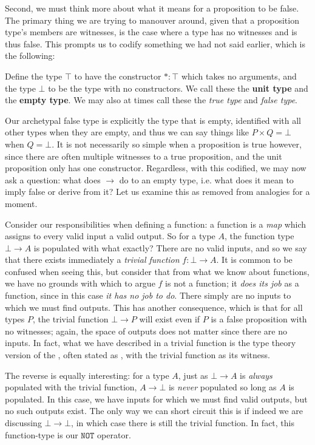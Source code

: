 \documentclass[11pt]{article}
\begin{document}
Second, we must think more about what it means for a proposition to be false. The primary thing we are trying to manouver around, given that a proposition type's members are witnesses, is the case where a type has no witnesses and is thus false. This prompts us to codify something we had not said earlier, which is the following:

\begin{definition}
Define the type $\top$ to have the constructor $* \colon \top$ which takes no arguments, and the type $\bot$ to be the type with no constructors. We call these the \textbf{unit type} and the \textbf{empty type}. We may also at times call these the \emph{true type} and \emph{false type}.
\end{definition}

Our archetypal false type is explicitly the type that is empty, identified with all other types when they are empty, and thus we can say things like $P \times Q = \bot$ when $Q = \bot$. It is not necessarily so simple when a proposition is true however, since there are often multiple witnesses to a true proposition, and the unit proposition only has one constructor. Regardless, with this codified, we may now ask a question: what does $\to$ do to an empty type, i.e. what does it mean to imply false or derive from it? Let us examine this as removed from analogies for a moment.

Consider our responsibilities when defining a function: a function is a \emph{map} which assigns to every valid input a valid output. So for a type $A$, the function type $\bot \to A$ is populated with what exactly? There are no valid inputs, and so we say that there exists immediately a \emph{trivial function} $f \colon \bot \to A$. It is common to be confused when seeing this, but consider that from what we know about functions, we have no grounds with which to argue $f$ is not a function; it \emph{does its job} as a function, since in this case \emph{it has no job to do}. There simply are no inputs to which we must find outputs. This has another consequence, which is that for all types $P$, the trivial function $\bot \to P$ will exist even if $P$ is a false proposition with no witnesses; again, the space of outputs does not matter since there are no inputs. In fact, what we have described in a trivial function is the type theory version of the , often stated as , with the trivial function as its witness.

The reverse is equally interesting: for a type $A$, just as $\bot \to A$ is \emph{always} populated with the trivial function, $A \to \bot$ is \emph{never} populated so long as $A$ is populated. In this case, we have inputs for which we must find valid outputs, but no such outputs exist. The only way we can short circuit this is if indeed we are discussing $\bot \to \bot$, in which case there is still the trivial function. In fact, this function-type is our $\mathtt{NOT}$ operator.
\end{document}
